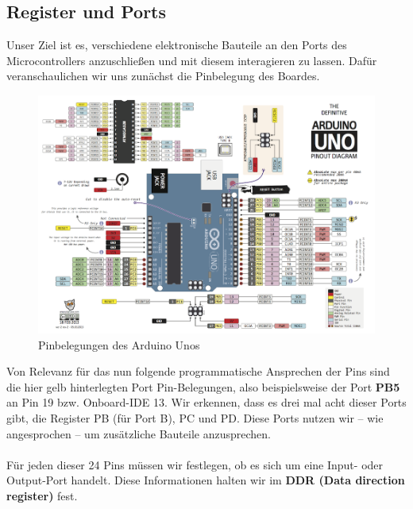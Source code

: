 \documentclass[11pt,a4paper]{scrartcl}
\begin{document}
\subsection{Register und Ports}
Unser Ziel ist es, verschiedene elektronische Bauteile an den Ports des Microcontrollers anzuschließen und mit diesem interagieren zu lassen. Dafür veranschaulichen wir uns zunächst die Pinbelegung des Boardes.
\begin{figure}[h!]
\centering
\includegraphics[scale=0.8]{pins.png}
\caption{Pinbelegungen des Arduino Unos}
\end{figure}
Von Relevanz für das nun folgende programmatische Ansprechen der Pins sind die hier gelb hinterlegten {\glqq}Port Pin{\grqq}-Belegungen, also beispielsweise der Port \textbf{PB5} an Pin 19 bzw. Onboard-IDE 13. Wir erkennen, dass es drei mal acht dieser Ports gibt, die Register PB (für Port B), PC und PD. Diese Ports nutzen wir -- wie angesprochen -- um zusätzliche Bauteile anzusprechen. \\\\
Für jeden dieser 24 Pins müssen wir festlegen, ob es sich um eine Input- oder Output-Port handelt. Diese Informationen halten wir im \textbf{DDR (Data direction register)} fest.
\end{document}
